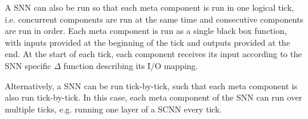 A \ac{SNN} can also be run so that each meta component is run in one logical tick, i.e. concurrent components are run at the same time and consecutive components are run in order.
Each meta component is run as a single black box function, with inputs provided at the beginning of the tick and outputs provided at the end.
At the start of each tick, each component receives its input according to the \ac{SNN} specific $\Delta$ function describing its I/O mapping.

Alternatively, a \ac{SNN} can be run tick-by-tick, such that each meta component is also run tick-by-tick.
In this case, each meta component of the \ac{SNN} can run over multiple ticks, e.g. running one layer of a \ac{SCNN} every tick.


